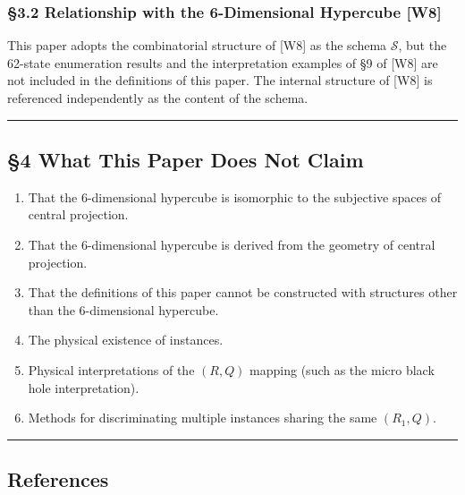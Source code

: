 \documentclass[
  a4paper,11pt]{article}
\providecommand{\tightlist}{%
  \setlength{\itemsep}{0pt}\setlength{\parskip}{0pt}}
\theoremstyle{definition}
\theoremstyle{remark}
\begin{document}
\subsubsection{§3.2 Relationship with the 6-Dimensional Hypercube
{[}W8{]}}\label{relationship-with-the-6-dimensional-hypercube-w8}

This paper adopts the combinatorial structure of {[}W8{]} as the schema
\(\mathcal{S}\), but the 62-state enumeration results and the
interpretation examples of §9 of {[}W8{]} are not included in the
definitions of this paper. The internal structure of {[}W8{]} is
referenced independently as the content of the schema.

\begin{center}\rule{0.5\linewidth}{0.5pt}\end{center}

\subsection{§4 What This Paper Does Not
Claim}\label{what-this-paper-does-not-claim}

\begin{enumerate}
\def\labelenumi{\arabic{enumi}.}
\tightlist
\item
  That the 6-dimensional hypercube is isomorphic to the subjective
  spaces of central projection.
\item
  That the 6-dimensional hypercube is derived from the geometry of
  central projection.
\item
  That the definitions of this paper cannot be constructed with
  structures other than the 6-dimensional hypercube.
\item
  The physical existence of instances.
\item
  Physical interpretations of the \((R, Q)\) mapping (such as the micro
  black hole interpretation).
\item
  Methods for discriminating multiple instances sharing the same
  \((R_1, Q)\).
\end{enumerate}

\begin{center}\rule{0.5\linewidth}{0.5pt}\end{center}

\subsection{References}\label{references}
\end{document}
